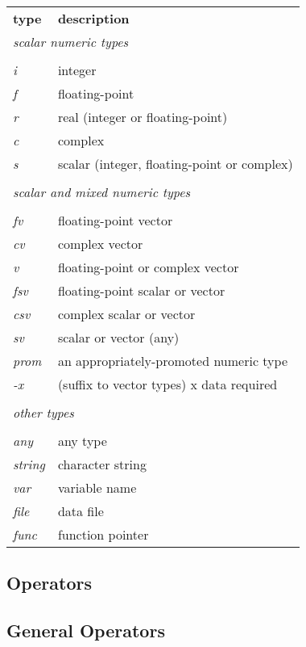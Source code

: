 \begin{longtable}{ll}
{\bf type} & {\bf description} \\
\multicolumn{2}{l}{\sl scalar numeric types} \\
\\
{\it i} & integer \\
{\it f} & floating-point \\
{\it r} & real (integer or floating-point) \\
{\it c} & complex \\
{\it s} & scalar (integer, floating-point or complex) \\
\\
\multicolumn{2}{l}{\sl scalar and mixed numeric types} \\
\\
{\it fv} & floating-point vector \\
{\it cv} & complex vector \\
{\it v} & floating-point or complex vector \\
{\it fsv} & floating-point scalar or vector \\
{\it csv} & complex scalar or vector \\
{\it sv} & scalar or vector (any) \\
{\it prom} & an appropriately-promoted numeric type \\
{\it -x} & (suffix to vector types) x data required \\
\\
\multicolumn{2}{l}{\sl other types} \\
\\
{\it any} & any type \\
{\it string} & character string \\
{\it var} & variable name \\
{\it file} & data file \\
{\it func} & function pointer
\end{longtable}
\clearpage
\subsection{Operators}

\subsection*{General Operators}

